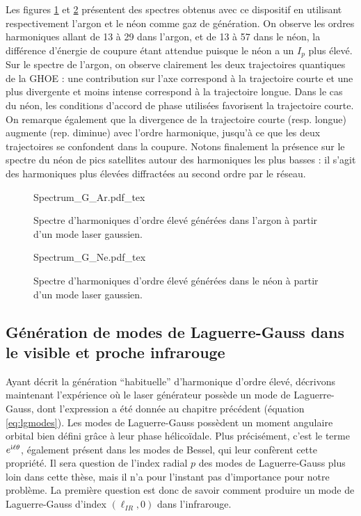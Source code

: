 Les figures \ref{Fig:SpectrumGAr} et \ref{Fig:SpectrumGNe} présentent des spectres obtenus avec ce dispositif en utilisant respectivement l'argon et le néon comme gaz de génération. On observe les ordres harmoniques allant de 13 à 29 dans l'argon, et de 13 à 57 dans le néon, la différence d'énergie de coupure étant attendue puisque le néon a un $I_p$ plus élevé. Sur le spectre de l'argon, on observe clairement les deux trajectoires quantiques de la GHOE : une contribution sur l'axe correspond à la trajectoire courte et une plus divergente et moins intense correspond à la trajectoire longue. Dans le cas du néon, les conditions d'accord de phase utilisées favorisent la trajectoire courte. On remarque également que la divergence de la trajectoire courte (resp. longue) augmente (rep. diminue) avec l'ordre harmonique, jusqu'à ce que les deux trajectoires se confondent dans la coupure. Notons finalement la présence sur le spectre du néon de pics satellites autour des harmoniques les plus basses : il s'agit des harmoniques plus élevées diffractées au second ordre par le réseau.
\begin{figure}[!ht]
\centering
\def\svgwidth{\columnwidth}
{Spectrum_G_Ar.pdf_tex}
\caption{Spectre d'harmoniques d'ordre élevé générées dans l'argon à partir d'un mode laser gaussien.}
\label{Fig:SpectrumGAr}
\end{figure}
\begin{figure}[!ht]
\centering
\def\svgwidth{\columnwidth}
{Spectrum_G_Ne.pdf_tex}
\caption{Spectre d'harmoniques d'ordre élevé générées dans le néon à partir d'un mode laser gaussien.}
\label{Fig:SpectrumGNe}
\end{figure}

\subsection{Génération de modes de Laguerre-Gauss dans le visible et proche infrarouge}
Ayant décrit la génération ``habituelle'' d'harmonique d'ordre élevé, décrivons maintenant l'expérience où le laser générateur possède un mode de Laguerre-Gauss, dont l'expression a été donnée au chapitre précédent (équation \ref{eq:lgmodes}). Les modes de Laguerre-Gauss possèdent un moment angulaire orbital bien défini grâce à leur phase hélicoïdale. Plus précisément, c'est le terme $e^{\mathrm{i}\ell\theta}$, également présent dans les modes de Bessel, qui leur confèrent cette propriété. Il sera question de l'index radial $p$ des modes de Laguerre-Gauss plus loin dans cette thèse, mais il n'a pour l'instant pas d'importance pour notre problème. La première question est donc de savoir comment produire un mode de Laguerre-Gauss d'index $(\ell_{IR},0)$ dans l'infrarouge. 

